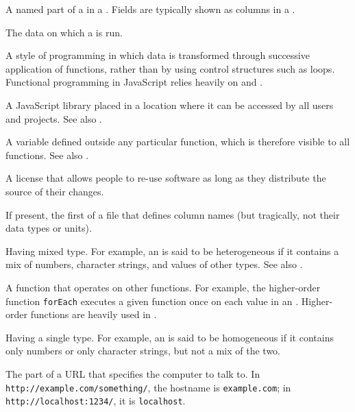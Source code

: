 \begin{description}
A named part of a  in a . Fields are typically shown as columns in a
.

The data on which a  is run.

A style of programming in which data is transformed through successive
application of functions, rather than by using control structures such as
loops. Functional programming in JavaScript relies heavily on
 and .

A JavaScript library placed in a location where it can be accessed by all
users and projects. See also .

A variable defined outside any particular function, which is therefore visible
to all functions. See also .

A license that allows people to re-use software as long as they distribute
the source of their changes.

If present, the first of a  file that defines column names (but
tragically, not their data types or units).

Having mixed type. For example, an  is said to be
heterogeneous if it contains a mix of numbers, character strings, and values
of other types. See also .

A function that operates on other functions. For example, the higher-order
function \texttt{forEach} executes a given function once on each value in an
.
Higher-order functions are heavily used in .

Having a single type. For example, an  is said to be
homogeneous if it contains only numbers or only character strings, but not a
mix of the two.

The part of a URL that specifies the computer to talk to. In
\texttt{http://example.com/something/}, the hostname is \texttt{example.com}; in
\texttt{http://localhost:1234/}, it is \texttt{localhost}.


\end{description}
